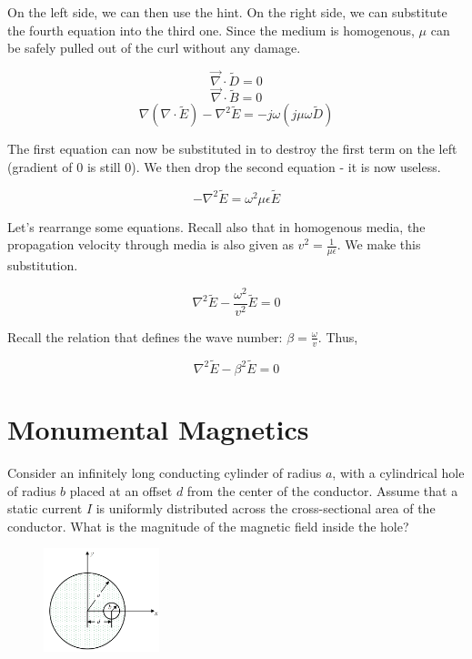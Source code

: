 \documentclass{article}
\begin{document}
On the left side, we can then use the hint. On the right side, we can substitute the fourth equation into the third one. Since the medium is homogenous, $\mu$ can be safely pulled out of the curl without any damage.

$$\vec{\nabla} \cdot \tilde{D} = 0$$
$$\vec{\nabla} \cdot \tilde{B} = 0$$
$$\nabla(\nabla \cdot \tilde{E}) - \nabla^2 \tilde{E} = - j \omega (j \mu \omega\tilde{D})$$

The first equation can now be substituted in to destroy the first term on the left (gradient of $0$ is still $0$). We then drop the second equation - it is now useless.

$$- \nabla^2 \tilde{E} = \omega^2 \mu \epsilon \tilde{E}$$

Let's rearrange some equations. Recall also that in homogenous media, the propagation velocity through media is also given as $v^2 = \frac{1}{\mu \epsilon}$. We make this substitution.

$$\nabla^2 \tilde{E} - \frac{\omega^2}{v^2} \tilde{E} = 0$$

Recall the relation that defines the wave number: $\beta = \frac{\omega}{v}$. Thus,

$$\boxed{\nabla^2 \tilde{E} - \beta^2 \tilde{E} = 0}$$

\newpage

\section{Monumental Magnetics}

Consider an infinitely long conducting cylinder of radius $a$, with a cylindrical hole of radius $b$ placed at an offset $d$ from the center of the conductor. Assume that a static current $I$ is uniformly distributed across the cross-sectional area of the conductor. What is the magnitude of the magnetic field inside the hole?

\begin{figure}[H]
\begin{center}
    \includegraphics[width= 0.3\textwidth]{figures/cyl.png}
\end{center}
\end{figure}
\end{document}
